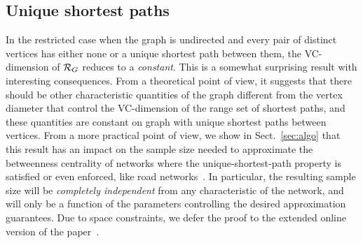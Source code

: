 
\subsection{Unique shortest paths}\label{sec:rangeunique}
In the restricted case when the graph is undirected and
every pair of distinct vertices has either none or a unique shortest path
between them, the VC-dimension of $\mathcal{R}_G$ reduces %
to a \emph{constant}. This is a
somewhat surprising result with interesting consequences. From a theoretical
point of view, it suggests that there should be other characteristic
quantities of the graph different from the vertex diameter that control the
VC-dimension of the range set of shortest paths, and these quantities are
constant on graph with unique shortest paths between vertices. From a more
practical point of view, we show in Sect.~\ref{sec:algo} that this result has an
impact on the sample size needed to approximate %
the betweenness centrality of
networks where the unique-shortest-path property is satisfied or even enforced,
like road networks~\citep{GeisbergerSS08}. In particular, the resulting sample
size will be \emph{completely independent} from any characteristic of the
network, and will only be a function of the parameters controlling the desired
approximation guarantees.
\ifproof
\else
Due to space constraints, we defer the proof to the extended online version of
the paper~\citep{RiondatoK13}.
\fi

